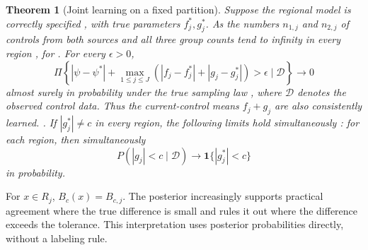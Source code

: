 \documentclass[11pt]{article}
\newcommand{\ind}{\mathbf{1}}
\newtheorem{theorem}{Theorem}
\theoremstyle{remark}\newtheorem{remark}{Remark}[section]
\providecommand{\DIFaddtex}[1]{{\protect\color{blue} \sf #1}} %
\providecommand{\DIFdeltex}[1]{{\protect\color{red} \scriptsize #1}} %
\providecommand{\DIFaddbegin}{} %
\providecommand{\DIFaddend}{} %
\providecommand{\DIFdelbegin}{} %
\providecommand{\DIFdelend}{} %
\providecommand{\DIFadd}[1]{\texorpdfstring{\DIFaddtex{#1}}{#1}} %
\providecommand{\DIFdel}[1]{\texorpdfstring{\DIFdeltex{#1}}{}} %
\begin{document}
\DIFdelbegin %
\DIFdelend \DIFaddbegin \begin{theorem}[Joint learning on a fixed partition]\label{thm:joint_learning}
\DIFaddend Suppose the regional model is correctly specified \DIFdelbegin \DIFdel{, with true parameters $f_j^*,g_j^*$. As the numbers $n_{1,j}$ and $n_{2,j}$ of controls from both sources }\DIFdelend \DIFaddbegin \DIFadd{and all three group counts }\DIFaddend tend to infinity in every region\DIFdelbegin \DIFdel{, for }\DIFdelend \DIFaddbegin \DIFadd{. For }\DIFaddend every $\epsilon>0$,
\DIFdelbegin %
\DIFdelend \DIFaddbegin \[
\Pi\left\{|\psi-\psi^*|+
\max_{1\le j\le J}(|f_j-f_j^*|+|g_j-g_j^*|)>\epsilon\mid\mathcal D\right\}
\longrightarrow0
\]\DIFaddend 
\DIFdelbegin \DIFdel{almost surely }\DIFdelend \DIFaddbegin \DIFadd{in probability }\DIFaddend under the true sampling law\DIFdelbegin \DIFdel{, where $\mathcal D$ denotes the observed control data. Thus the current-control means $f_j+g_j$ are also consistently learned. }\DIFdelend \DIFaddbegin \DIFadd{. }\DIFaddend If $|g_j^*|\ne c$ \DIFdelbegin \DIFdel{in every region, the following limits hold simultaneously
:
}%
\DIFdelend \DIFaddbegin \DIFadd{for each region, then simultaneously
}\[
P(|g_j|<c\mid\mathcal D)\longrightarrow\ind\{|g_j^*|<c\}
\]\DIFaddend 
\DIFaddbegin \DIFadd{in probability.
}\DIFaddend \end{theorem}
\DIFdelbegin \DIFdel{For $x\in R_j$, $B_c(x)=B_{c,j}$. The posterior increasingly supports practical agreement where the true difference is small and rules it out where the difference exceeds the tolerance. This interpretation uses posterior probabilities directly, without a labeling rule.
}\DIFdelend 
\end{document}
